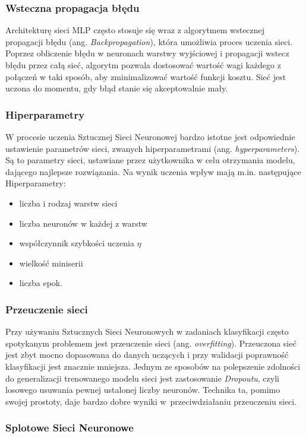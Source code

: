 \subsubsection{Wsteczna propagacja błędu}
Architekturę sieci MLP często stosuje się wraz z algorytmem wstecznej 
propagacji błędu (ang. \emph{Backpropagation}), która umożliwia proces uczenia sieci. Poprzez obliczenie błędu w neuronach warstwy wyjściowej i propagacji wstecz błędu przez całą sieć, algorytm pozwala dostosować wartość wagi każdego z połączeń w taki sposób, aby zminimalizować wartość funkcji kosztu. Sieć jest uczona do momentu, gdy błąd stanie się akceptowalnie mały. 

\subsubsection{Hiperparametry}
W procesie uczenia Sztucznej Sieci Neuronowej bardzo istotne jest odpowiednie ustawienie parametrów sieci, zwanych hiperparametrami (ang. \emph{hyperparameters}). Są to parametry sieci, ustawiane przez użytkownika w celu otrzymania modelu, dającego najlepsze rozwiązania. Na wynik uczenia wpływ mają m.in. następujące Hiperparametry:
\begin{itemize}
  \item liczba i rodzaj warstw sieci
  \item liczba neuronów w każdej z warstw
  \item współczynnik szybkości uczenia $\eta$
  \item wielkość miniserii
  \item liczba epok.
\end{itemize}

\subsubsection{Przeuczenie sieci}

Przy używaniu Sztucznych Sieci Neuronowych w zadaniach klasyfikacji często spotykanym problemem jest przeuczenie sieci (ang. \emph{overfitting}). Przeuczona sieć jest zbyt mocno dopasowana do danych uczących i przy walidacji poprawność klasyfikacji jest znacznie mniejsza. Jednym ze sposobów na polepszenie zdolności do generalizacji trenowanego modelu sieci jest zastosowanie \emph{Dropoutu}, czyli losowego usuwania pewnej ustalonej liczby neuronów. Technika ta, pomimo swojej prostoty, daje bardzo dobre wyniki w~przeciwdziałaniu przeuczeniu sieci.  

\subsubsection{Splotowe Sieci Neuronowe}

